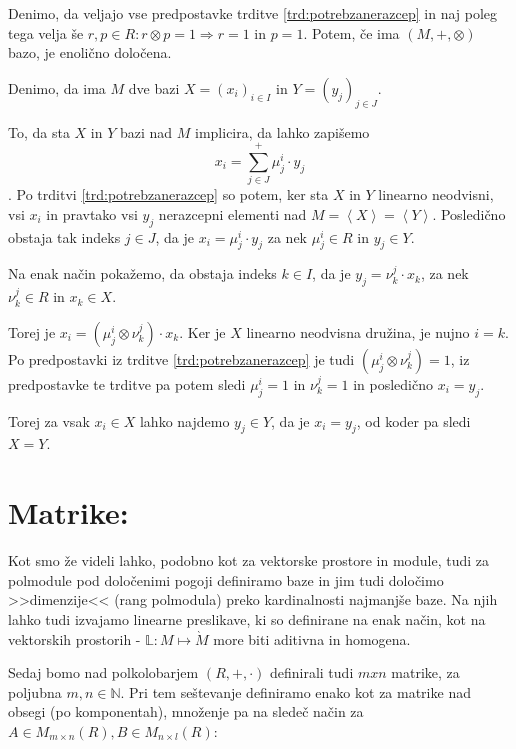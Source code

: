 \documentclass[mat1]{fmfdelo}
\newcommand{\N}{\mathbb{N}}
\newcommand{\Gen}[1]{\ensuremath{\left<{#1}\right>}}
\begin{document}
\begin{trditev}
	\label{trd:enoličbaza}
	Denimo, da veljajo vse predpostavke trditve \ref{trd:potrebzanerazcep} in naj poleg tega velja še $r, p\in R: r\otimes p = 1\Rightarrow r = 1$ in $p = 1$. Potem, če ima $(M, +, \otimes)$ bazo, je enolično določena.
\end{trditev}

\begin{dokaz}
	Denimo, da ima $M$ dve bazi $X=(x_i)_{i\in I}$ in $Y=(y_j)_{j \in J}$. 
	
	To, da sta $X$ in $Y$ bazi nad $M$ implicira, da lahko zapišemo $$x_i = \sum_{j\in J}^{+}\mu_j^i\cdot y_j $$.
	Po trditvi \ref{trd:potrebzanerazcep} so potem, ker sta $X$ in $Y$ linearno neodvisni, vsi $x_i$ in pravtako vsi $y_j$ nerazcepni elementi nad $M = \Gen{X} = \Gen{Y}$. Posledično obstaja tak indeks $j\in J$, da je $x_i = \mu_j^i \cdot y_j$ za nek $\mu_j^i \in R$ in $y_j\in Y$.
	
	Na enak način pokažemo, da obstaja indeks $k\in I$, da je $y_j = \nu_k^j \cdot x_k$, za nek $\nu_k^j \in R$ in $x_k \in X$.

	Torej je $x_i = (\mu_j^i \otimes \nu_k^j) \cdot x_k$. Ker je $X$ linearno neodvisna družina, je nujno $i = k$. Po predpostavki iz trditve \ref{trd:potrebzanerazcep} je tudi $(\mu_j^i \otimes \nu_k^j) = 1$, iz predpostavke te trditve pa potem sledi $\mu_j^i = 1$ in $\nu_k^j = 1$ in posledično $x_i = y_j$.
	
	Torej za vsak $x_i\in X$ lahko najdemo $y_j\in Y$, da je $x_i = y_j$, od koder pa sledi $X = Y$.
\end{dokaz}



\newpage

\section{Matrike:}

Kot smo že videli lahko, podobno kot za vektorske prostore in module, tudi za polmodule pod določenimi pogoji definiramo baze in jim tudi določimo >>dimenzije<< (rang polmodula) preko kardinalnosti najmanjše baze. Na njih lahko tudi izvajamo linearne preslikave, ki so definirane na enak način, kot na vektorskih prostorih - $\mathbb{L}: M \mapsto \grave{M}$ more biti aditivna in homogena.

Sedaj bomo nad polkolobarjem $(R, +, \cdot)$ definirali tudi $mxn$ matrike, za poljubna $m,n\in\N$. Pri tem seštevanje definiramo enako kot za matrike nad obsegi (po komponentah), množenje pa na sledeč način za $A\in M_{m\times n}(R), B\in M_{n\times l}(R)$:
\end{document}
